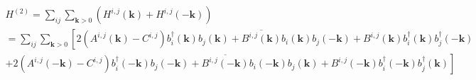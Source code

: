 \documentclass[a4paper,12pt]{article}
\begin{document}
            \begin{multline}
                H^{(2)} = \sum_{ij}\sum_{\boldsymbol{k} > 0} \left(H^{i,j}(\boldsymbol{k}) + H^{i,j}(-\boldsymbol{k})\right) \\
                = \sum_{ij}\sum_{\boldsymbol{k} > 0}\left[2(A^{i,j}(\boldsymbol{k}) - C^{i,j})b^{\dag}_{i}(\boldsymbol{k})b_{j}(\boldsymbol{k}) + 
                \overline{B^{i,j}(\boldsymbol{k})}b_{i}(\boldsymbol{k})b_{j}(-\boldsymbol{k}) +
                B^{i,j}(\boldsymbol{k})b^{\dag}_{i}(\boldsymbol{k})b^{\dag}_{j}(-\boldsymbol{k})\right. \\
                +\left.2(A^{i,j}(-\boldsymbol{k}) - C^{i,j})b^{\dag}_{i}(-\boldsymbol{k})b_{j}(-\boldsymbol{k}) + 
                \overline{B^{i,j}(-\boldsymbol{k})}b_{i}(-\boldsymbol{k})b_{j}(\boldsymbol{k}) +
                B^{i,j}(-\boldsymbol{k})b^{\dag}_{i}(-\boldsymbol{k})b^{\dag}_{j}(\boldsymbol{k})\right]
            \end{multline}
\end{document}
